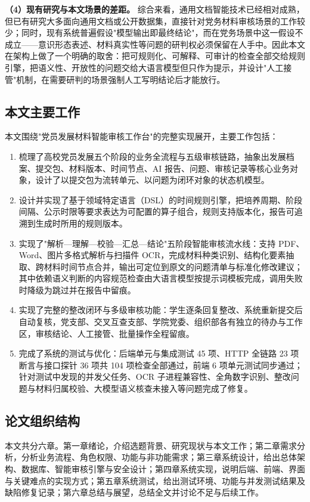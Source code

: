 \documentclass[12pt,a4paper]{ctexart}
\begin{document}
\textbf{（4）现有研究与本文场景的差距。} 综合来看，通用文档智能技术已经相对成熟，但已有研究大多面向通用文档或公开数据集，直接针对党务材料审核场景的工作较少；同时，现有系统普遍假设"模型输出即最终结论"，而在党务场景中这一假设不成立——意识形态表述、材料真实性等问题的研判权必须保留在人手中。因此本文在架构上做了一个明确的取舍：把可规则化、可解释、可审计的检查全部交给规则引擎，把语义性、开放性的问题交给大语言模型但只作为提示，并设计"人工接管"机制，在需要研判的场景强制人工写明结论后才能放行。

\subsection{本文主要工作}

本文围绕"党员发展材料智能审核工作台"的完整实现展开，主要工作包括：

\begin{enumerate}[label=（\arabic*）]
  \item 梳理了高校党员发展五个阶段的业务全流程与五级审核链路，抽象出发展档案、提交包、材料版本、时间节点、AI 报告、问题、审核记录等核心业务对象，设计了以提交包为流转单元、以问题为闭环对象的状态机模型。
  \item 设计并实现了基于领域特定语言（DSL）的时间规则引擎，把培养周期、阶段间隔、公示时限等要求表达为可配置的算子组合，规则支持版本化，报告可追溯到生成时所用的规则版本。
  \item 实现了"解析—理解—校验—汇总—结论"五阶段智能审核流水线：支持 PDF、Word、图片多格式解析与扫描件 OCR，完成材料种类识别、结构化要素抽取、跨材料时间节点合并，输出可定位到原文的问题清单与标准化修改建议；其中依赖语义判断的内容规范检查由大语言模型按提示词模板完成，调用失败时降级为跳过并在报告中留痕。
  \item 实现了完整的整改闭环与多级审核功能：学生逐条回复整改、系统重新提交后自动复核，党支部、交叉互查支部、学院党委、组织部各有独立的待办与工作区，审核结论、人工接管、批量操作全程留痕。
  \item 完成了系统的测试与优化：后端单元与集成测试 45 项、HTTP 全链路 23 项断言与接口探针 36 项共 104 项检查全部通过，前端 6 项单元测试同步通过；针对测试中发现的并发父任务、OCR 子进程兼容性、全角数字识别、整改问题与材料归属校验、大模型语义核查未接入等问题完成了修复。
\end{enumerate}

\subsection{论文组织结构}

本文共分六章。第一章绪论，介绍选题背景、研究现状与本文工作；第二章需求分析，分析业务流程、角色权限、功能与非功能需求；第三章系统设计，给出总体架构、数据库、智能审核引擎与安全设计；第四章系统实现，说明后端、前端、界面与关键难点的实现方式；第五章系统测试，给出测试环境、功能与并发测试结果及缺陷修复记录；第六章总结与展望，总结全文并讨论不足与后续工作。
\end{document}
